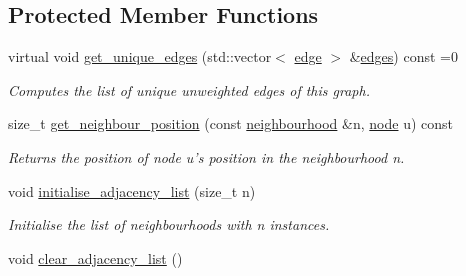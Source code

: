 \subsection*{Protected Member Functions}
\begin{DoxyCompactItemize}
\item 
virtual void \hyperlink{classlgraph_1_1uxgraph_a5a014396ad3bd800028be641c140e5a0}{get\-\_\-unique\-\_\-edges} (std\-::vector$<$ \hyperlink{namespacelgraph_a76bd7d50719f03de7a85db259d80d572}{edge} $>$ \&\hyperlink{classlgraph_1_1uxgraph_af6a643eaca31fa945b428567ab0fa66d}{edges}) const =0
\begin{DoxyCompactList}\small\item\em Computes the list of unique unweighted edges of this graph. \end{DoxyCompactList}\item 
size\-\_\-t \hyperlink{classlgraph_1_1xxgraph_a8c176b1d19cf8d0b299c419e325df21d}{get\-\_\-neighbour\-\_\-position} (const \hyperlink{namespacelgraph_a052e7766c13f3a43cec0aec8173fdede}{neighbourhood} \&n, \hyperlink{namespacelgraph_a397169dd66adf725210a30fb7251773e}{node} u) const 
\begin{DoxyCompactList}\small\item\em Returns the position of node {\itshape u's} position in the neighbourhood {\itshape n}. \end{DoxyCompactList}\item 
\hypertarget{classlgraph_1_1xxgraph_a682d586f850add8b7e637aeea81b0292}{void \hyperlink{classlgraph_1_1xxgraph_a682d586f850add8b7e637aeea81b0292}{initialise\-\_\-adjacency\-\_\-list} (size\-\_\-t n)}\label{classlgraph_1_1xxgraph_a682d586f850add8b7e637aeea81b0292}

\begin{DoxyCompactList}\small\item\em Initialise the list of neighbourhoods with {\itshape n} instances. \end{DoxyCompactList}\item 
\hypertarget{classlgraph_1_1xxgraph_a6b15c62c68919722f7eb18fe273d45fe}{void \hyperlink{classlgraph_1_1xxgraph_a6b15c62c68919722f7eb18fe273d45fe}{clear\-\_\-adjacency\-\_\-list} ()}\label{classlgraph_1_1xxgraph_a6b15c62c68919722f7eb18fe273d45fe}


\end{DoxyCompactItemize}
